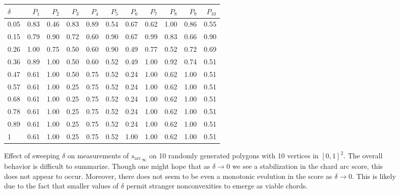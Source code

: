 \documentclass[]{jocg}
\newcommand{\chordarc}{{s_{\textrm{arc}}}}
\theoremstyle{definition}
\theoremstyle{remark}
\begin{document}
\begin{figure}[t]
  \centering
  \begin{tabular}{lrrrrrrrrrr}
    \toprule
    $\delta$ & $P_1$ & $P_2$ & $P_3$ & $P_4$ & $P_5$ & $P_6$ & $P_7$ & $P_8$ & $P_9$ & $P_{10}$ \\
    \midrule
    0.05  &  0.83 &  0.46 &  0.83 &  0.89 &  0.54 &  0.67 &  0.62 &  1.00 &  0.86 &  0.55 \\
    0.15  &  0.79 &  0.90 &  0.72 &  0.60 &  0.90 &  0.67 &  0.99 &  0.83 &  0.66 &  0.90 \\
    0.26  &  1.00 &  0.75 &  0.50 &  0.60 &  0.90 &  0.49 &  0.77 &  0.52 &  0.72 &  0.69 \\
    0.36  &  0.89 &  1.00 &  0.50 &  0.60 &  0.52 &  0.49 &  1.00 &  0.92 &  0.74 &  0.51 \\
    0.47  &  0.61 &  1.00 &  0.50 &  0.75 &  0.52 &  0.24 &  1.00 &  0.62 &  1.00 &  0.51 \\
    0.57  &  0.61 &  1.00 &  0.25 &  0.75 &  0.52 &  0.24 &  1.00 &  0.62 &  1.00 &  0.51 \\
    0.68  &  0.61 &  1.00 &  0.25 &  0.75 &  0.52 &  0.24 &  1.00 &  0.62 &  1.00 &  0.51 \\
    0.78  &  0.61 &  1.00 &  0.25 &  0.75 &  0.52 &  0.24 &  1.00 &  0.62 &  1.00 &  0.51 \\
    0.89  &  0.61 &  1.00 &  0.25 &  0.75 &  0.52 &  0.24 &  1.00 &  0.62 &  1.00 &  0.51 \\
    1     &  0.61 &  1.00 &  0.25 &  0.75 &  0.52 &  1.00 &  1.00 &  0.62 &  1.00 &  0.51 \\
    \bottomrule
  \end{tabular}
  \caption{%
    Effect of sweeping $\delta$ on measurements of ${\chordarc}_\infty$ on
    10 randomly generated polygons with 10 vertices in $[0,1]^2$. The overall behavior is
    difficult to summarize.  Though one might hope that as $\delta \to 0$ we see
    a stabilization in the chard arc score, this does not appear to occur.
    Moreover, there does not seem to be even a monotonic evolution in the score
    as $\delta \to 0$. This is likely due to the fact that smaller values of
    $\delta$ permit stranger nonconvexities to emerge as viable chords.
  }
  \label{fig:delta-arc}
\end{figure}
\end{document}
